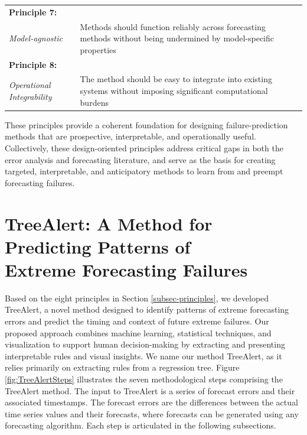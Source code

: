 \documentclass[12pt]{article}
\let\oldtable\table
\let\endoldtable\endtable
\renewenvironment{table}
  {\oldtable\spacingset{1}}
  {\endoldtable}
\begin{document}
\begin{table}
\begin{tabular}{|m{2.7cm}|m{12.5cm}|}
\hline
\centering\textbf{Principle 7:} \\ \centering\textit{Model-agnostic} & Methods should function reliably across forecasting methods without being undermined by model-specific properties \\
\hline
\centering\textbf{Principle 8:} \\ \centering\textit{Operational Integrability} & The method should be easy to integrate into existing  systems without \newline imposing significant computational burdens \\
\hline
\end{tabular}
\label{tab:principles}
\end{table}

These principles provide a coherent foundation for designing failure-prediction methods that are prospective, interpretable, and operationally useful. Collectively, these design-oriented principles address critical gaps in both the error analysis and forecasting literature, and serve as the basis for creating targeted, interpretable, and anticipatory methods to learn from and preempt forecasting failures. %

\section{TreeAlert: A Method for Predicting Patterns of\\Extreme Forecasting Failures}
\label{sec:treealert_method}

Based on the eight principles in Section \ref{subsec-principles}, we developed TreeAlert, a novel method designed to identify patterns of extreme forecasting errors and predict the timing and context of future extreme failures. Our proposed approach combines machine learning, statistical techniques, and visualization to support human decision-making by extracting and presenting interpretable rules and visual insights. We name our method TreeAlert, as it relies primarily on extracting rules from a regression tree. Figure \ref{fig:TreeAlertSteps} illustrates the seven methodological steps comprising the TreeAlert method. The input to TreeAlert is a series of forecast errors and their associated timestamps. The forecast errors are the differences between the actual time series values and their forecasts, where forecasts can be generated using any forecasting algorithm. Each step is articulated in the following subsections.
\end{document}
